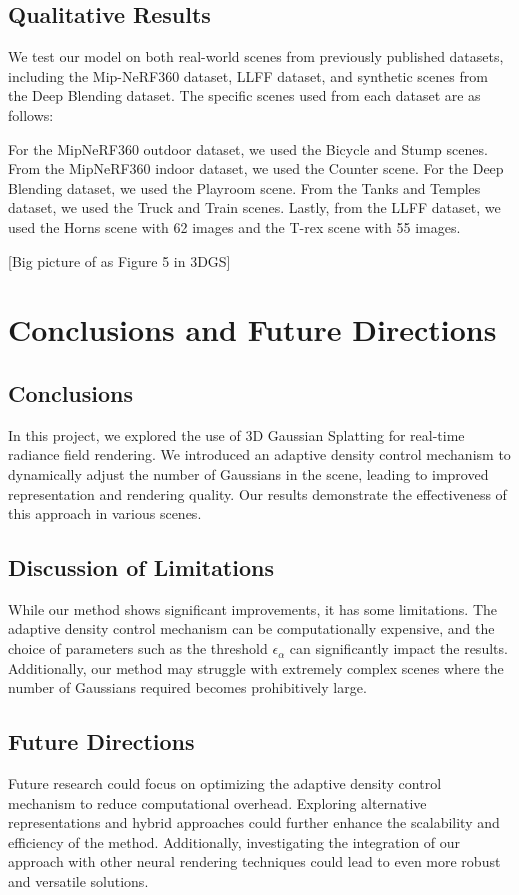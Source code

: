 \documentclass[11pt]{report}
\begin{document}
\section{Qualitative Results}
We test our model on both real-world scenes from previously published datasets, including the Mip-NeRF360 dataset, LLFF dataset, and synthetic scenes from the Deep Blending dataset. The specific scenes used from each dataset are as follows: 

For the MipNeRF360 outdoor dataset, we used the Bicycle and Stump scenes. From the MipNeRF360 indoor dataset, we used the Counter scene. For the Deep Blending dataset, we used the Playroom scene. From the Tanks and Temples dataset, we used the Truck and Train scenes. Lastly, from the LLFF dataset, we used the Horns scene with 62 images and the T-rex scene with 55 images.

[Big picture of as Figure 5 in 3DGS]





\chapter{Conclusions and Future Directions}

\section{Conclusions}
In this project, we explored the use of 3D Gaussian Splatting for real-time radiance field rendering. We introduced an adaptive density control mechanism to dynamically adjust the number of Gaussians in the scene, leading to improved representation and rendering quality. Our results demonstrate the effectiveness of this approach in various scenes.

\section{Discussion of Limitations}
While our method shows significant improvements, it has some limitations. The adaptive density control mechanism can be computationally expensive, and the choice of parameters such as the threshold $\epsilon_\alpha$ can significantly impact the results. Additionally, our method may struggle with extremely complex scenes where the number of Gaussians required becomes prohibitively large.

\section{Future Directions}
Future research could focus on optimizing the adaptive density control mechanism to reduce computational overhead. Exploring alternative representations and hybrid approaches could further enhance the scalability and efficiency of the method. Additionally, investigating the integration of our approach with other neural rendering techniques could lead to even more robust and versatile solutions.
\end{document}
